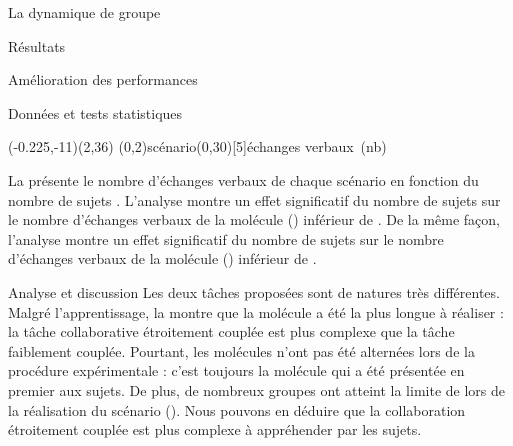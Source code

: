 \documentclass[myfrancais,ngerman,english,frenchb]{mythesis}
\begin{document}
\begin{mychapter}{La dynamique de groupe}
\begin{mysection}{Résultats}
\begin{mysubsection}{Amélioration des performances}
\begin{mysubsubsection}{Données et tests statistiques}
					\begin{myfigure}
						\begin{myps}(-0.225,-11)(2,36)
							\myaxes(0,2){scénario}(0,30)[5]{échanges verbaux~(nb)}
						\end{myps}
					\end{myfigure}

					La  présente le nombre d'échanges verbaux  de chaque scénario  en fonction du nombre de sujets .
					L'analyse montre un effet significatif du nombre de sujets  sur le nombre d'échanges verbaux  de la molécule \myPrion () inférieur de .
					De la même façon, l'analyse montre un effet significatif du nombre de sujets  sur le nombre d'échanges verbaux  de la molécule \myUbiquitin () inférieur de .
				\end{mysubsubsection}
				\begin{mysubsubsection}{Analyse et discussion}
					Les deux tâches proposées sont de natures très différentes.
					Malgré l'apprentissage, la  montre que la molécule \myUbiquitin a été la plus longue à réaliser : la tâche collaborative étroitement couplée est plus complexe que la tâche faiblement couplée.
					Pourtant, les molécules n'ont pas été alternées lors de la procédure expérimentale  : c'est toujours la molécule \myPrion qui a été présentée en premier aux sujets.
					De plus, de nombreux groupes ont atteint la limite de  lors de la réalisation du scénario  (\myUbiquitin).
					Nous pouvons en déduire que la collaboration étroitement couplée est plus complexe à appréhender par les sujets.


\end{mysubsubsection}
\end{mysubsection}
\end{mysection}
\end{mychapter}
\end{document}
